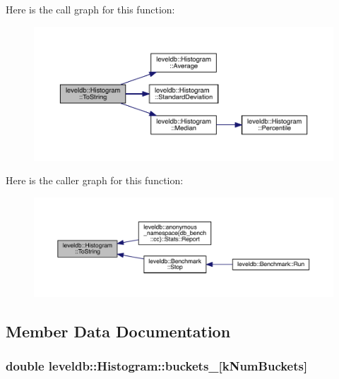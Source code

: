 Here is the call graph for this function\+:\nopagebreak
\begin{figure}[H]
\begin{center}
\leavevmode
\includegraphics[width=350pt]{classleveldb_1_1_histogram_a78fde129eef6d9072ff986afd18d1163_cgraph}
\end{center}
\end{figure}




Here is the caller graph for this function\+:
\nopagebreak
\begin{figure}[H]
\begin{center}
\leavevmode
\includegraphics[width=350pt]{classleveldb_1_1_histogram_a78fde129eef6d9072ff986afd18d1163_icgraph}
\end{center}
\end{figure}




\subsection{Member Data Documentation}
\hypertarget{classleveldb_1_1_histogram_a332d20f5b4811483f443a0fffde60a27}{}
\subsubsection[{buckets\+\_\+}]{\setlength{\rightskip}{0pt plus 5cm}double leveldb\+::\+Histogram\+::buckets\+\_\+\mbox{[}{\bf k\+Num\+Buckets}\mbox{]}\hspace{0.3cm}{\ttfamily [private]}}\label{classleveldb_1_1_histogram_a332d20f5b4811483f443a0fffde60a27}
\hypertarget{classleveldb_1_1_histogram_aaad18e83be993ecfe63a566869a9d3cc}{}
